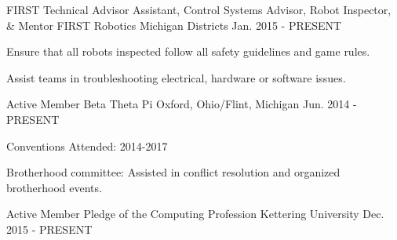 
\begin{cventries}

  \cventry
    {FIRST Technical Advisor Assistant, Control Systems Advisor, Robot Inspector, \& Mentor} %
    {FIRST Robotics} %
    {Michigan Districts} %
    {Jan. 2015 - PRESENT} %
    {
      \begin{cvitems} %
        \item {}
        \item {Ensure that all robots inspected follow all safety guidelines and game rules.}
        \item {Assist teams in troubleshooting electrical, hardware or software issues.}
      \end{cvitems}
    }

  \cventry
    {Active Member} %
    {Beta Theta Pi} %
    {Oxford, Ohio/Flint, Michigan} %
    {Jun. 2014 - PRESENT} %
    {
      \begin{cvitems} %
        \item {Conventions Attended: 2014-2017}
        \item {Brotherhood committee: Assisted in conflict resolution and organized brotherhood events.}
      \end{cvitems}
    }

  \cventry
    {Active Member} %
    {Pledge of the Computing Profession} %
    {Kettering University} %
    {Dec. 2015 - PRESENT} %
    {
      \begin{cvitems} %
      \end{cvitems}
    }

\end{cventries}
